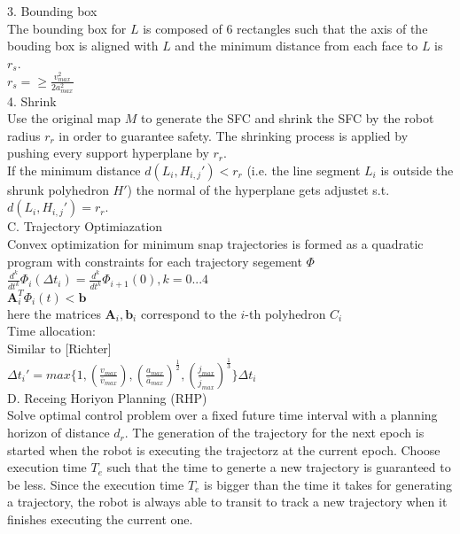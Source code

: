 3. Bounding box\\
The bounding box for $L$ is composed of 6 rectangles such that the axis of the bouding box is aligned with $L$ and the minimum distance from each face to $L$ is $r_s$.\\

$r_s = \geq \frac{v_{max}^2}{2a_{max}^2}$\\

4. Shrink\\
Use the original map $M$ to generate the SFC and shrink the SFC by the robot radius $r_r$ in order to guarantee safety. The shrinking process is applied by pushing every support hyperplane by $r_r$.\\

If the minimum distance $d(L_i,H_{i,j}') < r_r$ (i.e. the line segment $L_i$ is outside the shrunk polyhedron $H'$) the normal of the hyperplane gets adjustet s.t. $d(L_i,H_{i,j}') = r_r$.\\

C. Trajectory Optimiazation\\

Convex optimization for minimum snap trajectories is formed as a quadratic program with constraints for each trajectory segement $\Phi$\\

$\frac{d^k}{dt^k}\Phi_i(\Delta t_i) = \frac{d^k}{dt^k}\Phi_{i+1}(0), k=0...4$ \\

$\mathbf{A}_i^T \Phi_i (t) < \mathbf{b}$ \\

here the matrices $\mathbf{A}_i, \mathbf{b}_i$ correspond to the $i$-th polyhedron $C_i$\\

Time allocation:\\
Similar to [Richter] \\

$\Delta t_i'=max \lbrace 1, (\frac{v_{max}}{\overline{v}_{max}}), (\frac{a_{max}}{\overline{a}_{max}})^\frac{1}{2}, (\frac{j_{max}}{\overline{j}_{max}})^\frac{1}{3} \rbrace \Delta t_i$\\

D. Receing Horiyon Planning (RHP)\\

Solve optimal control problem over a fixed future time interval with a planning horizon of distance $d_r$. The generation of the trajectory for the next epoch is started when the robot is executing the trajectorz at the current epoch. Choose execution time $T_e$ such that the time to generte a new trajectory is guaranteed to be less. Since the execution time $T_e$ is bigger than the time it takes for generating a trajectory, the robot is always able to transit to track a new trajectory when it  finishes executing the current one. 

